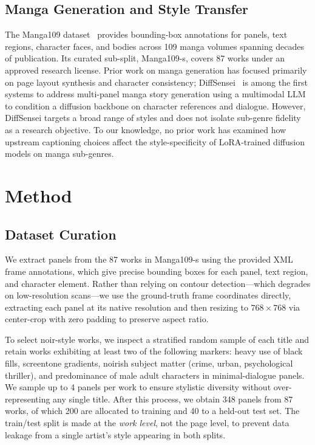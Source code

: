 \documentclass[10pt,twocolumn,letterpaper]{article}
\begin{document}
\subsection{Manga Generation and Style Transfer}

The Manga109 dataset~\cite{matsui2017manga109} provides bounding-box annotations for panels, text regions, character faces, and bodies across 109 manga volumes spanning decades of publication.
Its curated sub-split, Manga109-s, covers 87 works under an approved research license.
Prior work on manga generation has focused primarily on page layout synthesis and character consistency; DiffSensei~\cite{chen2024diffsensei} is among the first systems to address multi-panel manga story generation using a multimodal LLM to condition a diffusion backbone on character references and dialogue.
However, DiffSensei targets a broad range of styles and does not isolate sub-genre fidelity as a research objective.
To our knowledge, no prior work has examined how upstream captioning choices affect the style-specificity of LoRA-trained diffusion models on manga sub-genres.

\section{Method}

\subsection{Dataset Curation}

We extract panels from the 87 works in Manga109-s using the provided XML frame annotations, which give precise bounding boxes for each panel, text region, and character element.
Rather than relying on contour detection—which degrades on low-resolution scans—we use the ground-truth frame coordinates directly, extracting each panel at its native resolution and then resizing to $768 \times 768$ via center-crop with zero padding to preserve aspect ratio.

To select noir-style works, we inspect a stratified random sample of each title and retain works exhibiting at least two of the following markers: heavy use of black fills, screentone gradients, noirish subject matter (crime, urban, psychological thriller), and predominance of male adult characters in minimal-dialogue panels.
We sample up to 4 panels per work to ensure stylistic diversity without over-representing any single title.
After this process, we obtain 348 panels from 87 works, of which 200 are allocated to training and 40 to a held-out test set.
The train/test split is made at the \emph{work level}, not the page level, to prevent data leakage from a single artist's style appearing in both splits.
\end{document}
